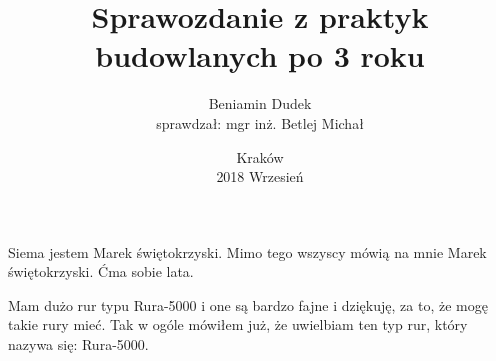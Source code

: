 \documentclass[a4paper,11pt,fleqn]{mwart}
\title{Sprawozdanie z praktyk budowlanych po 3 roku}
\date{Kraków\\ 2018 Wrzesień}
\author{Beniamin Dudek \\ sprawdzał: mgr inż. Betlej Michał}
\begin{document}
	\maketitle
	Siema jestem Marek świętokrzyski. Mimo tego wszyscy mówią na mnie Marek świętokrzyski.
	Ćma sobie lata.

	Mam dużo rur typu Rura-5000 i one są bardzo fajne i dziękuję, za to, że mogę takie rury mieć.
	Tak w ogóle mówiłem już, że uwielbiam ten typ rur, który nazywa się: Rura-5000.
\end{document}
